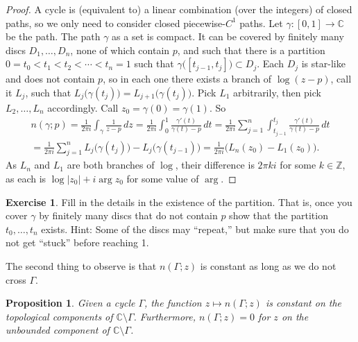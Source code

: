 \documentclass[12pt,openany]{book}
\newcommand{\sabs}[1]{\lvert {#1} \rvert}
\newcommand{\C}{{\mathbb{C}}}
\newcommand{\Z}{{\mathbb{Z}}}
\newcommand{\myquote}[1]{``#1''}
\theoremstyle{plain}
\newtheorem{prop}[thm]{Proposition}
\theoremstyle{remark}
\theoremstyle{definition}
\newenvironment{exbox}{%
    \def\FrameCommand{\vrule width 1pt \relax\hspace{10pt}}%
    \MakeFramed{\advance\hsize-\width\FrameRestore}%
}{%
    \endMakeFramed
}
\theoremstyle{exercise}
\newtheorem{exercise}{Exercise}[section]
\theoremstyle{example}
\begin{document}
\begin{proof}
A cycle is (equivalent to) a linear combination (over the integers) of closed paths,
so we only need to consider closed piecewise-$C^1$ paths.
Let $\gamma \colon [0,1] \to \C$ be the path.
The path $\gamma$ as a set is compact.  It can be covered by finitely many
discs $D_1,\ldots,D_n$, none of which contain $p$, and such that there is a
partition $0 = t_0 < t_1 < t_2 < \cdots < t_n = 1$ such that
$\gamma\bigl([t_{j-1},t_j]\bigr) \subset D_j$.  Each $D_j$ is star-like and
does not contain $p$,
so in each one there exists a branch of $\log (z-p)$, call it $L_j$,
such that $L_j\bigl(\gamma(t_j)\bigr) = L_{j+1}\bigl(\gamma(t_j)\bigr)$.
Pick $L_1$ arbitrarily, then pick $L_2,\ldots,L_n$ accordingly.
Call $z_0 = \gamma(0) = \gamma(1)$.  So
\begin{multline*}
n(\gamma;p)
=
\frac{1}{2\pi i} \int_\gamma \frac{1}{z-p} \, dz
=
\frac{1}{2\pi i} \int_0^1 \frac{\gamma'(t)}{\gamma(t)-p} \, dt
=
\frac{1}{2\pi i} \sum_{j=1}^n \int_{t_{j-1}}^{t_j} \frac{\gamma'(t)}{\gamma(t)-p} \, dt
\\
=
\frac{1}{2\pi i} \sum_{j=1}^n L_j\bigl(\gamma(t_j)\bigr) -
L_j\bigl(\gamma(t_{j-1})\bigr)
=
\frac{1}{2\pi i} \bigl( L_n(z_0) - L_1(z_0) \bigr) .
\end{multline*}
As $L_n$ and $L_1$ are both branches of $\log$, their difference is
$2\pi k i$ for some $k \in \Z$, as each is $\log\sabs{z_0} + i \arg z_0$ for some value of
$\arg$.
\end{proof}

\begin{exbox}
\begin{exercise}
Fill in the details in the existence of the partition.  That is, once you
cover $\gamma$ by finitely many discs that do not contain $p$ show that
the partition $t_0,\ldots,t_n$ exists.  Hint: Some of the discs may
\myquote{repeat,} but make sure that you do not get \myquote{stuck} before reaching 1.
\end{exercise}
\end{exbox}

The second thing to observe is that $n(\Gamma;z)$ is constant as long as we
do not cross $\Gamma$.

\begin{prop} \label{prop:windingconstant}
Given a cycle $\Gamma$,
the function $z \mapsto n(\Gamma;z)$ is constant on the
topological components of $\C \setminus \Gamma$.
Furthermore, $n(\Gamma;z) = 0$ for $z$ on the unbounded component
of $\C \setminus \Gamma$.
\end{prop}
\end{document}
